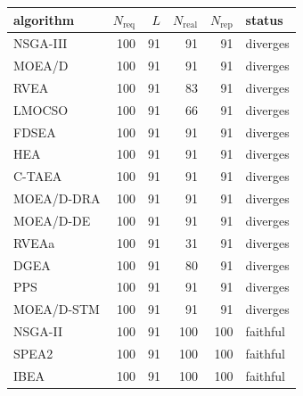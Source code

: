 \footnotesize
\setlength{\tabcolsep}{5pt}
\begin{tabular}{lrrrrl}
\toprule
algorithm & $N_{\mathrm{req}}$ & $L$ & $N_{\mathrm{real}}$ & $N_{\mathrm{rep}}$ & status \\
\midrule
NSGA-III & 100 & 91 & 91 & 91 & diverges \\
MOEA/D & 100 & 91 & 91 & 91 & diverges \\
RVEA & 100 & 91 & 83 & 91 & diverges \\
LMOCSO & 100 & 91 & 66 & 91 & diverges \\
FDSEA & 100 & 91 & 91 & 91 & diverges \\
HEA & 100 & 91 & 91 & 91 & diverges \\
C-TAEA & 100 & 91 & 91 & 91 & diverges \\
MOEA/D-DRA & 100 & 91 & 91 & 91 & diverges \\
MOEA/D-DE & 100 & 91 & 91 & 91 & diverges \\
RVEAa & 100 & 91 & 31 & 91 & diverges \\
DGEA & 100 & 91 & 80 & 91 & diverges \\
PPS & 100 & 91 & 91 & 91 & diverges \\
MOEA/D-STM & 100 & 91 & 91 & 91 & diverges \\
\addlinespace
NSGA-II & 100 & 91 & 100 & 100 & faithful \\
SPEA2 & 100 & 91 & 100 & 100 & faithful \\
IBEA & 100 & 91 & 100 & 100 & faithful \\
\bottomrule
\end{tabular}
